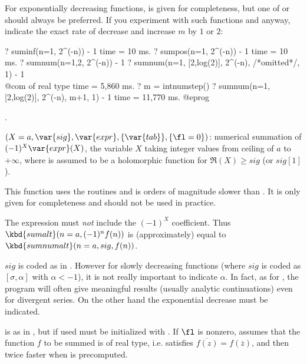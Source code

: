 For exponentially decreasing functions,  is given for
completeness, but one of  or  should always be
preferred. If you experiment with such functions and  anyway,
indicate the exact rate of decrease and increase $m$ by $1$ or $2$:

\bprog
? suminf(n=1, 2^(-n)) - 1
time = 10 ms.
? sumpos(n=1, 2^(-n)) - 1
time = 10 ms.
? sumnum(n=1,2, 2^(-n)) - 1
? sumnum(n=1, [2,log(2)], 2^(-n), /*omitted*/, 1) - 1 \\@com of real type
time = 5,860 ms.
? m = intnumstep()
? sumnum(n=1,[2,log(2)], 2^(-n), m+1, 1) - 1
time = 11,770 ms.
@eprog

.

$(X=a,\var{sig},\var{expr},\{\var{tab}\},\{\fl=0\})$: \label{se:sumnumalt}numerical
summation of $(-1)^X\var{expr}(X)$, the variable $X$ taking integer values from
ceiling of $a$ to $+\infty$, where  is assumed to be a holomorphic
function for $\Re(X)\ge sig$ (or $sig[1]$).

 This function uses the  routines and is
orders of magnitude slower than . It is only given for
completeness and should not be used in practice.

 The expression  must \emph{not} include the
$(-1)^X$ coefficient. Thus $\kbd{sumalt}(n=a,(-1)^nf(n))$ is (approximately)
equal to $\kbd{sumnumalt}(n=a,sig,f(n))$.

$sig$ is coded as in . However for slowly decreasing functions
(where $sig$ is coded as $[\sigma,\alpha]$ with $\alpha<-1$), it is not
really important to indicate $\alpha$. In fact, as for , the
program will often give meaningful results (usually analytic continuations)
even for divergent series. On the other hand the exponential decrease must be
indicated.

 is as in , but if used must be initialized with
. If $\fl$ is nonzero, assumes that the function $f$ to be
summed is of real type, i.e. satisfies $\overline{f(z)}=f(\overline{z})$, and
then twice faster when  is precomputed.

